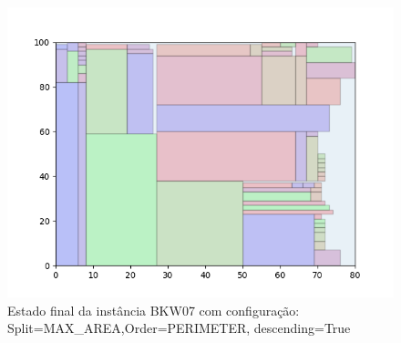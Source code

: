 \begin{figure}[H]
    \centering
    \caption[]{Estado final da instância BKW07 com configuração: Split=MAX_AREA,Order=PERIMETER, descending=True}
    \label{fig:bkw07-max_area-perimeter-true}
    \includegraphics[scale=0.5]{output/figures/bkw/bkw07/max_area/perimeter/true/00}
\end{figure}
